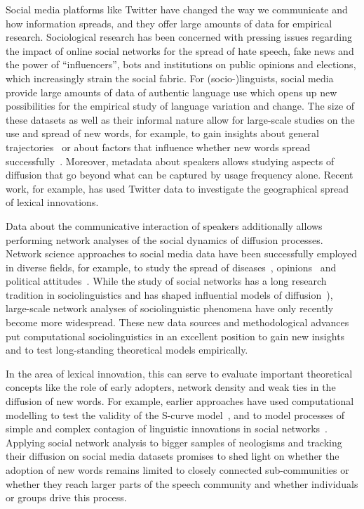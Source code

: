 \documentclass[
  a4paper,
  abstract=on,
  captions=tableabove
  ]{scrartcl}
\begin{document}
Social media platforms like Twitter have changed the way we communicate and how information spreads, and they offer large amounts of data for empirical research. Sociological research has been concerned with pressing issues regarding the impact of online social networks for the spread of hate speech, fake news and the power of \enquote{influencers}, bots and institutions on public opinions and elections, which increasingly strain the social fabric. For (socio-)linguists, social media provide large amounts of data of authentic language use which opens up new possibilities for the empirical study of language variation and change. The size of these datasets as well as their informal nature allow for large-scale studies on the use and spread of new words, for example, to gain insights about general trajectories~\parencite{Nini2017ApplicationGrowth} or about factors that influence whether new words spread successfully~\parencite{Grieve2018NaturalSelection}. Moreover, metadata about speakers allows studying aspects of diffusion that go beyond what can be captured by usage frequency alone. Recent work, for example, has used Twitter data to investigate the geographical spread of lexical innovations.~\parencite{Eisenstein2014DiffusionLexical,Grieve2017GeographicalPatterns,Grieve2018MappingLexical}

Data about the communicative interaction of speakers additionally allows performing network analyses of the social dynamics of diffusion processes. Network science approaches to social media data have been successfully employed in diverse fields, for example, to study the spread of diseases~\parencite{Lu2018AccurateInfluenza}, opinions~\parencite{West2014ExploitingSocial} and political attitudes~\parencite{PewResearchCenter2019NationalPolitics}. While the study of social networks has a long research tradition in sociolinguistics and has shaped influential models of diffusion~\parencite[e.g.][]{Milroy1985LinguisticChange}), large-scale network analyses of sociolinguistic phenomena have only recently become more widespread. These new data sources and methodological advances put computational sociolinguistics in an excellent position to gain new insights and to test long-standing theoretical models empirically.

In the area of lexical innovation, this can serve to evaluate important theoretical concepts like the role of early adopters, network density and weak ties in the diffusion of new words. For example, earlier approaches have used computational modelling to test the validity of the S-curve model~\parencite{Blythe2012ScurvesMechanisms}, and to model processes of simple and complex contagion of linguistic innovations in social networks~\parencite{Goel2016SocialDynamics}. Applying social network analysis to bigger samples of neologisms and tracking their diffusion on social media datasets promises to shed light on whether the adoption of new words remains limited to closely connected sub-communities or whether they reach larger parts of the speech community and whether individuals or groups drive this process.
\end{document}
